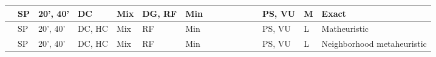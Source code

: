 \documentclass[preprint,12pt,authoryear]{elsarticle}
\begin{document}
\begin{landscape}
\begin{table}[h!]
{\begin{tabular}{|l|l|l|l|l|l|l|l|l|l|l|l|l|l|l|l|}
    \hline
    \cite{Kebedow2019IncludingProblem}    & SP & 20', 40'      & DC     & Mix & DG, RF & Min &     &  &  &  &     &     & PS, VU & M & Exact                              \\ 
    \hline
    \cite{Korach2020MatheuristicsBays}     & SP & 20', 40'      & DC, HC & Mix & RF     & Min &     &  &  &  &     &     & PS, VU & L & Matheuristic                       \\ 
    \hline
    \cite{Rashed2021AVessels}     & SP & 20', 40'      & DC, HC & Mix & RF     & Min &     &  &  &  &     &     & PS, VU & L & Neighborhood metaheuristic                              \\ 
    \hline
    \end{tabular}
    }
    \end{table}
    
    \end{landscape}\clearpage
\end{document}
